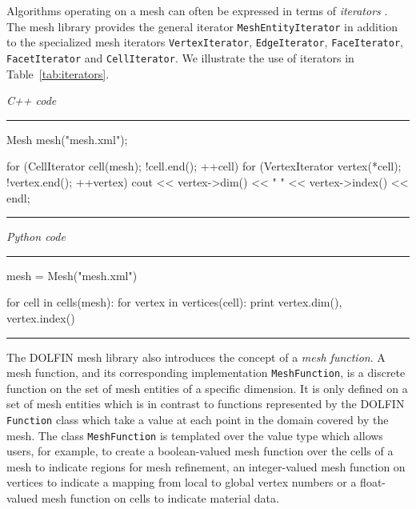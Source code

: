\documentclass[acmtoms]{acmtrans2m}
\newenvironment{pythoncode}[1]{\center\minipage{#1\textwidth}\footnotesize\hfill\it Python code \rm\vspace{0.1cm}\hrule\renewcommand{\baselinestretch}{0.9}\footnotesize\verbatim}{\endverbatim\hrule\normalsize\endminipage\newline\endcenter}
\newenvironment{cppcode}[1]{\center\minipage{#1\textwidth}\footnotesize\hfill\it C++ code \rm\vspace{0.1cm}\hrule\renewcommand{\baselinestretch}{0.9}\footnotesize\verbatim}{\endverbatim\hrule\normalsize\endminipage\newline\endcenter}
\newcommand{\emp}[1]{\texttt{#1}}
\newcommand{\dolfin}{DOLFIN}
\begin{document}
Algorithms operating on a mesh can often be expressed in terms of
\emph{iterators} \cite{Ber02,Ber06}. The mesh library provides the
general iterator \texttt{MeshEntityIterator} in addition to the
specialized mesh iterators \texttt{Vertex\-Iterator},
\texttt{EdgeIterator}, \texttt{Face\-Iterator}, \texttt{FacetIterator}
and \texttt{Cell\-Iterator}. We illustrate the use of iterators in
Table~\ref{tab:iterators}.
\begin{table}
  \begin{center}
    \begin{cppcode}{0.9}
Mesh mesh("mesh.xml");

for (CellIterator cell(mesh); !cell.end(); ++cell)
  for (VertexIterator vertex(*cell); !vertex.end(); ++vertex)
      cout << vertex->dim() << " " << vertex->index() << endl;
    \end{cppcode}
    \begin{pythoncode}{0.9}
mesh = Mesh("mesh.xml")

for cell in cells(mesh):
    for vertex in vertices(cell):
        print vertex.dim(), vertex.index()
    \end{pythoncode}
    \caption{Basic use of \dolfin{} mesh iterators for iterating
      over all vertices of all cells of a mesh in C++ (top) and
      Python (bottom).}
    \label{tab:iterators}
  \end{center}
\end{table}

The \dolfin{} mesh library also introduces the concept of a \emph{mesh
  function}. A mesh function, and its corresponding implementation
\emp{MeshFunction}, is a discrete function on the set of mesh entities
of a specific dimension. It is only defined on a set of mesh entities
which is in contrast to functions represented by the \dolfin{}
\emp{Function} class which take a value at each point in the
domain covered by the mesh.  The class \emp{MeshFunction} is templated
over the value type which allows users, for example, to create a
boolean-valued mesh function over the cells of a mesh to indicate
regions for mesh refinement, an integer-valued mesh function on
vertices to indicate a mapping from local to global vertex numbers
or a float-valued mesh function on cells to indicate material data.
\end{document}
